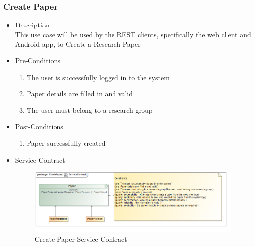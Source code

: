\documentclass[a4paper,10pt]{article}
\begin{document}
\subsubsection{Create Paper}
	\begin{itemize}
		\item Description\\
			This use case will be used by the REST clients, specifically the web client and Android app, to Create a Research Paper
		\item Pre-Conditions
			\begin{enumerate}
				\item The user is successfully logged in to the system
				\item Paper details are filled in and valid
				\item The user must belong to a research group
			\end{enumerate}
		\item Post-Conditions
			\begin{enumerate}
				\item Paper successfully created

						
			\end{enumerate}
		\item Service Contract
			\begin{figure}[H]
				\includegraphics[scale=0.5]{CreatePaperServiceContract}
				\caption{Create Paper Service Contract}
			\end{figure}



	\end{itemize}
\end{document}
